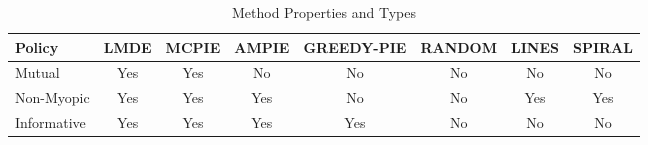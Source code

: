 			\begin{table}[t]
				{\footnotesize
				\begin{center}
					\begin{tabular}{ l c c c c c c c }
					\hline
					Policy & LMDE & MCPIE & AMPIE & GREEDY-PIE & RANDOM & LINES & SPIRAL \\
					\hline
					Mutual & Yes & Yes & No & No & No & No & No \\
					Non-Myopic & Yes & Yes & Yes & No & No & Yes & Yes \\
					Informative & Yes & Yes & Yes & Yes & No & No & No \\
					\hline
					\end{tabular}
				\end{center}
				}
		  	\caption{Method Properties and Types}
		  	\label{Table:MethodProperties}			
		  	\end{table}	
		  	

		
%			
			
